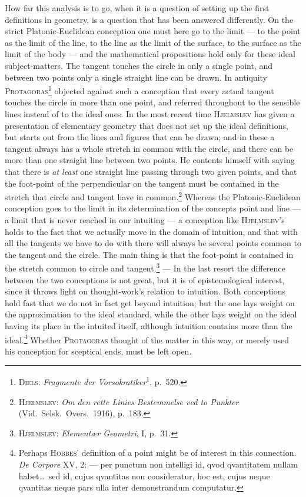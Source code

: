\documentclass[12pt]{book}
\newcommand{\opage}[1]{\marginnote{\footnotesize\textit{[#1]}}}
\begin{document}
How far this analysis is to go, when it is a question of setting up the first
definitions in geometry, is a question that has been answered differently. On the
strict Platonic-Euclidean conception one must here go to the limit --- to the
point as the limit of the line, to the line as the limit of the surface, to the
surface as the limit of the body --- and the mathematical propositions hold only
for these ideal subject-matters. The tangent touches the circle in only a single
point, and between two points only a single straight line can be drawn. In
antiquity \textsc{Protagoras}\footnote{\textsc{Diels}: \textit{Fragmente der
Vorsokratiker}\textsuperscript{1}, p.\ 520.} objected against such a conception
that every actual tangent touches the circle in more than one point, and referred
throughout to the sensible lines instead of to the ideal ones. In the most recent
time \textsc{Hjelmslev} has given a presentation of elementary geometry that does
not set up the ideal definitions, but starts out from the lines and figures that
can be drawn; and in these a tangent always has a whole stretch in common with
the circle, and there can be more than one straight line between two points. He
contents himself with saying that there is \emph{at least} one straight line
passing through two given points, and that the foot-point of the perpendicular on
the tangent must be contained in the \opage{42}stretch that circle and tangent have in
common.\footnote{\textsc{Hjelmslev}: \textit{Om den rette Linies Bestemmelse ved
to Punkter} (Vid.\ Selsk.\ Overs.\ 1916), p.\ 183.} Whereas the
Platonic-Euclidean conception goes to the limit in its determination of the
concepts point and line --- a limit that is never reached in our intuiting --- a
conception like \textsc{Hjelmslev}'s holds to the fact that we actually move in
the domain of intuition, and that with all the tangents we have to do with there
will always be several points common to the tangent and the circle. The main
thing is that the foot-point is contained in the stretch common to circle and
tangent.\footnote{\textsc{Hjelmslev}: \textit{Elementær Geometri}, I, p.\ 31.}
--- In the last resort the difference between the two conceptions is not great,
but it is of epistemological interest, since it throws light on thought-work's
relation to intuition. Both conceptions hold fast that we do not in fact get
beyond intuition; but the one lays weight on the approximation to the ideal
standard, while the other lays weight on the ideal having its place in the
intuited itself, although intuition contains more than the
ideal.\footnote{Perhaps \textsc{Hobbes}' definition of a point might be of
interest in this connection. \textit{De Corpore} XV, 2: --- per punctum non
intelligi id, qvod qvantitatem nullam habet\dots\ sed id, cujus qvantitas non
consideratur, hoc est, cujus neque qvantitas neque pars ulla inter demonstrandum
computatur.} Whether \textsc{Protagoras} thought of the matter in this way, or
merely used his conception for sceptical ends, must be left open.
\end{document}
